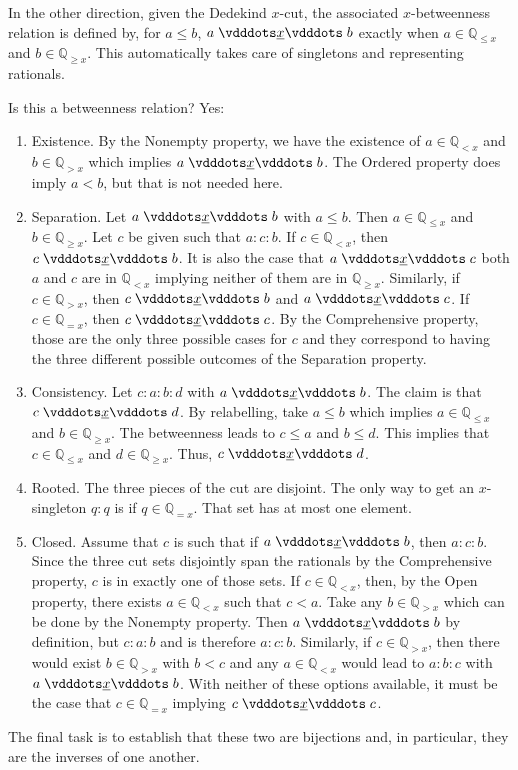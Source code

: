 \documentclass[12pt]{article}
\newcommand{\qcut}[2][x]{\ensuremath{\mathbb{Q}_{#2 #1}}}
\newcommand{\qlt}[1][x]{\qcut[#1]{<}}
\newcommand{\qeq}[1][x]{\qcut[#1]{=}}
\newcommand{\qgt}[1][x]{\qcut[#1]{>}}
\newcommand{\qgeq}[1][x]{\qcut[#1]{\geq}}
\newcommand{\qleq}[1][x]{\qcut[#1]{\leq}}
\begin{document}
In the other direction, given the Dedekind $x$-cut, the associated $x$-betweenness relation is defined by, for $a \leq b$, $a \xrel b$ exactly when $a \in \qleq$ and $b \in \qgeq$. This automatically takes care of singletons and representing rationals. 

Is this a betweenness relation? Yes: 
\begin{enumerate}
    \item Existence. By the Nonempty property, we have the existence of $a \in \qlt$ and $b \in \qgt$ which implies $a \xrel b$. The Ordered property does imply $a < b$, but that is not needed here. 
    \item Separation. Let $a \xrel b$ with $a \leq b$.  Then $a \in \qleq$ and $b \in \qgeq$. Let $c$ be given such that $a:c:b$. If $c \in \qlt$, then  $c \xrel b$. It is also the case that \sout{$a \xrel c$} both $a$ and $c$ are in $\qlt$ implying neither of them are in $\qgeq$. Similarly, if $c \in \qgt$, then \sout{$c \xrel b$} and $a \xrel c$. If $c \in \qeq$, then $c \xrel c$. By the Comprehensive property, those are the only three possible cases for $c$ and they correspond to having the three different possible outcomes of the Separation property. 
    \item Consistency. Let $c:a:b:d$ with $ a \xrel b$. The claim is that $c \xrel d$. By relabelling, take $a \leq b$ which implies $a \in \qleq$ and $b \in \qgeq$.  The betweenness leads to $c \leq a$ and $ b \leq d$. This implies that $c \in \qleq$ and $ d \in \qgeq$. Thus, $c \xrel d$.
    \item Rooted. The three pieces of the cut are disjoint. The only way to get an $x$-singleton $q:q$ is if $q \in \qeq$. That set has at most one element. 
    \item Closed. Assume that $c$ is such that if $a \xrel b$, then $a:c:b$. Since the three cut sets disjointly span the rationals by the Comprehensive property, $c$ is in exactly one of those sets. If $c \in \qlt$, then, by the Open property, there exists $a \in \qlt$ such that $c < a$. Take any $b \in \qgt$ which can be done by the Nonempty property. Then $a \xrel b$ by definition, but $c: a:b$ and is therefore \sout{$a:c:b$}. Similarly, if $c \in \qgt$, then there would exist $b \in \qgt$ with $b < c$ and any $a \in \qlt$ would lead to $a:b:c$ with $a \xrel b$. With neither of these options available, it must be the case that $c \in \qeq$ implying $c \xrel c$.    
\end{enumerate}

The final task is to establish that these two are bijections and, in particular, they are the inverses of one another. 
\end{document}
